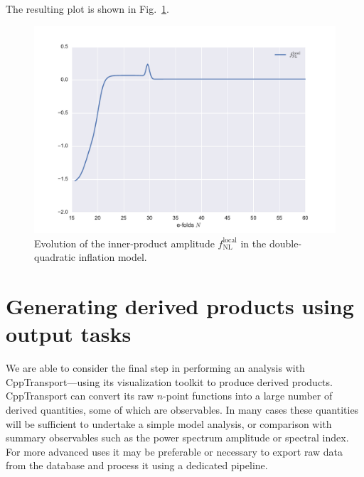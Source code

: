 \documentclass[11pt,a4paper]{article}
\newcommand{\fNL}{f_{\mathrm{NL}}}
\newcommand{\fNLlocal}{\fNL^{\text{local}}}
\newcommand{\packagefont}{\sffamily}
\newcommand{\CppTransport}{{\packagefont CppTransport}}
\begin{document}
The resulting plot is shown in Fig.~\ref{fig:dquad-fNL-plot}.
\begin{figure}
    \begin{center}
        \includegraphics[scale=0.65]{Plots/fNL_local}    
    \end{center}
    \caption{\label{fig:dquad-fNL-plot}Evolution of the inner-product
    amplitude $\fNLlocal$ in the double-quadratic inflation model.}
\end{figure}

\section{Generating derived products using output tasks}
\label{sec:derived-products}

We are able to consider the final step in
performing an analysis with {\CppTransport}---using its visualization
toolkit to produce derived products.
{\CppTransport} can convert its raw $n$-point functions into a large
number of derived quantities, some of which are observables.
In many cases these quantities will be sufficient to undertake
a simple model analysis, or comparison with summary observables
such as the power spectrum amplitude or spectral index.
For more advanced uses it may be
preferable or necessary to export raw data from the database
and process it using a dedicated pipeline.
\end{document}
